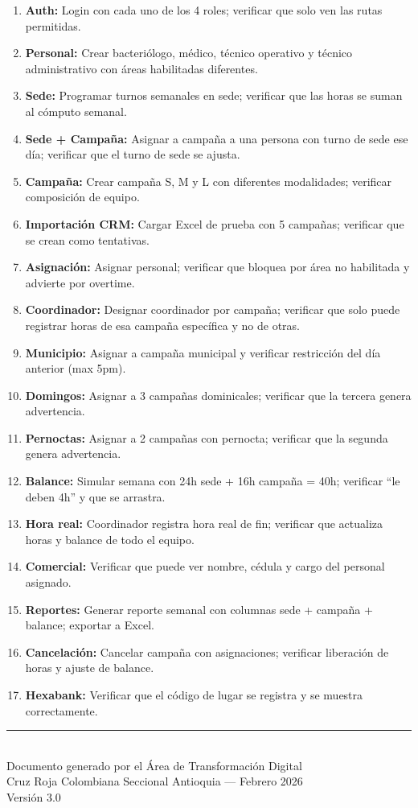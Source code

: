 \documentclass[10pt,a4paper]{article}
\begin{document}
\begin{enumerate}[leftmargin=2em]
    \item \textbf{Auth:} Login con cada uno de los 4 roles; verificar que solo ven las rutas permitidas.
    \item \textbf{Personal:} Crear bacteri\'{o}logo, m\'{e}dico, t\'{e}cnico operativo y t\'{e}cnico administrativo con \'{a}reas habilitadas diferentes.
    \item \textbf{Sede:} Programar turnos semanales en sede; verificar que las horas se suman al c\'{o}mputo semanal.
    \item \textbf{Sede + Campaña:} Asignar a campaña a una persona con turno de sede ese d\'{i}a; verificar que el turno de sede se ajusta.
    \item \textbf{Campaña:} Crear campaña S, M y L con diferentes modalidades; verificar composici\'{o}n de equipo.
    \item \textbf{Importaci\'{o}n CRM:} Cargar Excel de prueba con 5 campañas; verificar que se crean como tentativas.
    \item \textbf{Asignaci\'{o}n:} Asignar personal; verificar que bloquea por \'{a}rea no habilitada y advierte por overtime.
    \item \textbf{Coordinador:} Designar coordinador por campaña; verificar que solo puede registrar horas de esa campaña espec\'{i}fica y no de otras.
    \item \textbf{Municipio:} Asignar a campaña municipal y verificar restricci\'{o}n del d\'{i}a anterior (max 5pm).
    \item \textbf{Domingos:} Asignar a 3 campañas dominicales; verificar que la tercera genera advertencia.
    \item \textbf{Pernoctas:} Asignar a 2 campañas con pernocta; verificar que la segunda genera advertencia.
    \item \textbf{Balance:} Simular semana con 24h sede + 16h campaña = 40h; verificar ``le deben 4h'' y que se arrastra.
    \item \textbf{Hora real:} Coordinador registra hora real de fin; verificar que actualiza horas y balance de todo el equipo.
    \item \textbf{Comercial:} Verificar que puede ver nombre, c\'{e}dula y cargo del personal asignado.
    \item \textbf{Reportes:} Generar reporte semanal con columnas sede + campaña + balance; exportar a Excel.
    \item \textbf{Cancelaci\'{o}n:} Cancelar campaña con asignaciones; verificar liberaci\'{o}n de horas y ajuste de balance.
    \item \textbf{Hexabank:} Verificar que el c\'{o}digo de lugar se registra y se muestra correctamente.
\end{enumerate}

\vfill

\begin{center}
    {\color{azuloscuro}\rule{0.5\textwidth}{1pt}}\\[0.5cm]
    {\small\color{grisoscuro} Documento generado por el \'{A}rea de Transformaci\'{o}n Digital\\
    Cruz Roja Colombiana Seccional Antioquia --- Febrero 2026\\
    Versi\'{o}n 3.0}
\end{center}
\end{document}
